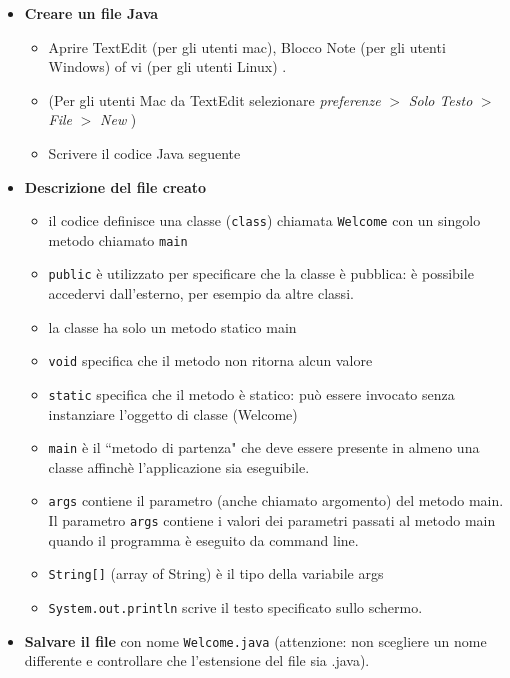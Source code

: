 \documentclass{article}
\theoremstyle{definition}
\begin{document}
\begin{itemize}
\item \textbf{Creare un file Java}
\begin{itemize}
\item Aprire  TextEdit (per gli utenti mac), Blocco Note (per gli utenti Windows) of vi (per gli utenti Linux) .
\item (Per gli utenti Mac da TextEdit selezionare \textit{preferenze} $>$ \textit{Solo Testo} $>$ \textit{File} $>$ \textit{New} )
\item Scrivere il codice  Java seguente
\end{itemize}
\end{itemize}

\begin{itemize}
\item \textbf{Descrizione del file creato}
\begin{itemize}
\item il codice definisce una classe (\texttt{class}) chiamata  \texttt{Welcome} con un singolo metodo  chiamato \texttt{main}
\item \texttt{public} \`e utilizzato per specificare che la classe \`e pubblica: \`e possibile accedervi dall'esterno, per esempio da altre classi.
\item la classe ha solo un metodo statico main
\item \texttt{void} specifica che il metodo non ritorna alcun valore
\item \texttt{static} specifica che il metodo \`e statico: pu\`o essere invocato senza instanziare l'oggetto di classe  (Welcome)
\item \texttt{main} \`e il ``metodo di partenza" che deve essere presente in almeno una classe affinch\`e l'applicazione sia eseguibile. 
\item \texttt{args} contiene il parametro (anche chiamato argomento) del metodo main. Il parametro \texttt{args} contiene i valori dei parametri passati al metodo main quando il programma \`e eseguito da command line.
\item \texttt{String[]} (array of String) \`e il tipo della variabile args 
\item \texttt{System.out.println} scrive il testo specificato sullo schermo.
\end{itemize}
\end{itemize}
\begin{itemize}
\item \textbf{Salvare il file} con nome \texttt{Welcome.java} (attenzione: non scegliere un nome differente e controllare che l'estensione del file sia .java).
\end{itemize}
\end{document}
